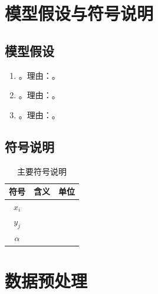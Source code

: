 \documentclass[12pt]{article}
\begin{document}
\section{模型假设与符号说明}
\subsection{模型假设}
\begin{enumerate}[label=假设\arabic*：]
  \item \underline{\hspace{5cm}}。理由：\underline{\hspace{4cm}}。
  \item \underline{\hspace{5cm}}。理由：\underline{\hspace{4cm}}。
  \item \underline{\hspace{5cm}}。理由：\underline{\hspace{4cm}}。
\end{enumerate}

\subsection{符号说明}
\begin{table}[H]
\centering
\caption{主要符号说明}
\begin{tabular}{ccc}
\toprule
符号 & 含义 & 单位 \\
\midrule
$x_i$ & \underline{\hspace{3cm}} & \underline{\hspace{1cm}} \\
$y_j$ & \underline{\hspace{3cm}} & \underline{\hspace{1cm}} \\
$\alpha$ & \underline{\hspace{3cm}} & \underline{\hspace{1cm}} \\
\bottomrule
\end{tabular}
\end{table}

\section{数据预处理}
\end{document}
